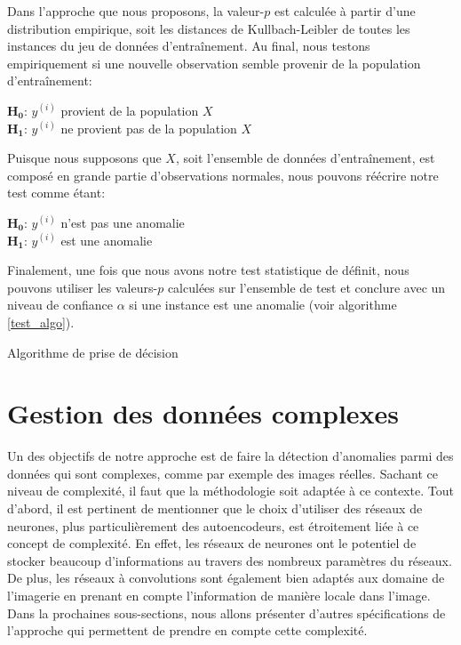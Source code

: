 Dans l'approche que nous proposons, la valeur-$p$ est calculée à partir d'une distribution empirique, soit les distances de Kullbach-Leibler de toutes les instances du jeu de données d'entraînement. Au final, nous testons empiriquement si une nouvelle observation semble provenir de la population d'entraînement:

\begin{center}
	$\boldsymbol{H_0}$: $y^{(i)}$ provient de la population $X$ \\
	$\boldsymbol{H_1}$: $y^{(i)}$ ne provient pas de la population $X$
\end{center}

\noindent Puisque nous supposons que $X$, soit l'ensemble de données d'entraînement, est composé en grande partie d'observations normales, nous pouvons réécrire notre test comme étant:

\begin{center}
	$\boldsymbol{H_0}$: $y^{(i)}$ n'est pas une anomalie \\
	$\boldsymbol{H_1}$: $y^{(i)}$ est une anomalie
\end{center}

Finalement, une fois que nous avons notre test statistique de définit, nous pouvons utiliser les valeurs-$p$ calculées sur l'ensemble de test et conclure avec un niveau de confiance $\alpha$ si une instance est une anomalie (voir algorithme \ref{test_algo}).

\begin{center}
	\begin{algorithm}[H] \label{test_algo}
		\SetAlgoLined
		\caption{Algorithme de prise de décision}
	\end{algorithm}
\end{center}

\section{Gestion des données complexes}

Un des objectifs de notre approche est de faire la détection d'anomalies parmi des données qui sont complexes, comme par exemple des images réelles. Sachant ce niveau de complexité, il faut que la méthodologie soit adaptée à ce contexte. Tout d'abord, il est pertinent de mentionner que le choix  d'utiliser des réseaux de neurones, plus particulièrement des autoencodeurs, est étroitement liée à ce concept de complexité. En effet, les réseaux de neurones ont le potentiel de stocker beaucoup d'informations au travers des nombreux paramètres du réseaux. De plus, les réseaux à convolutions sont également bien adaptés aux domaine de l'imagerie en prenant en compte l'information de manière locale dans l'image. Dans la prochaines sous-sections, nous allons présenter d'autres spécifications de l'approche qui permettent de prendre en compte cette complexité.

